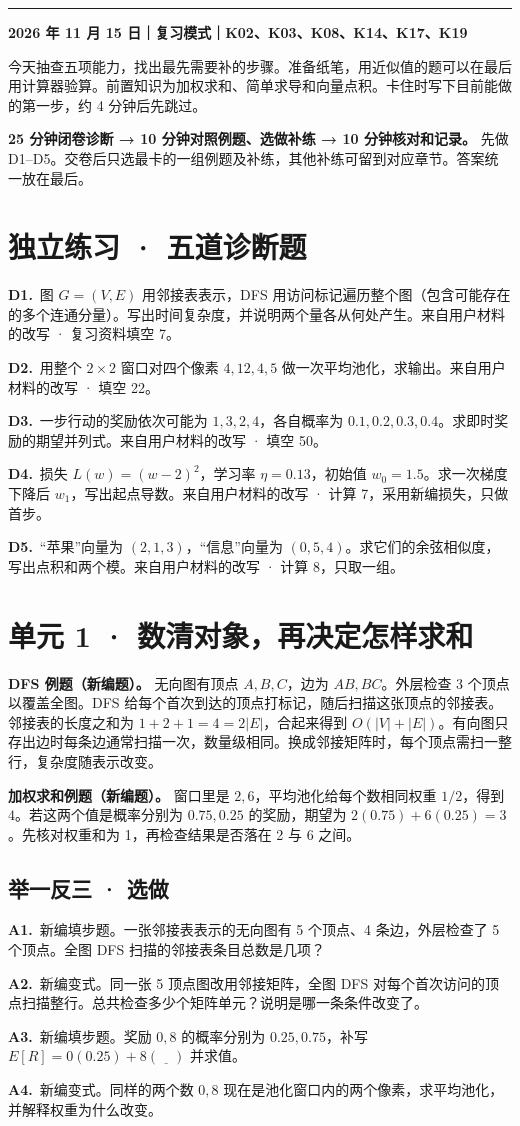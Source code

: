 \documentclass[UTF8,a4paper,11pt]{ctexart}
\newcommand{\chaptertitle}[1]{\Needspace{8\baselineskip}\noindent{\LARGE\bfseries\sffamily #1}\par\vspace{4mm}\hrule\vspace{6mm}}
\newcommand{\PracticeQuestion}[3]{\par\Needspace{4\baselineskip}\noindent\begin{minipage}{\linewidth}\textbf{#1.}\ #2\par\noindent\rule{0pt}{#3mm}\par\end{minipage}\par}
\begin{document}
\chaptertitle{第 1 天 · 45 分钟起点诊断}
\textbf{2026 年 11 月 15 日｜复习模式｜K02、K03、K08、K14、K17、K19}

今天抽查五项能力，找出最先需要补的步骤。准备纸笔，用近似值的题可以在最后用计算器验算。前置知识为加权求和、简单求导和向量点积。卡住时写下目前能做的第一步，约 4 分钟后先跳过。

\textbf{25 分钟闭卷诊断 → 10 分钟对照例题、选做补练 → 10 分钟核对和记录。} 先做 D1–D5。交卷后只选最卡的一组例题及补练，其他补练可留到对应章节。答案统一放在最后。

\section{独立练习 · 五道诊断题}
\PracticeQuestion{D1}{图 $G=(V,E)$ 用邻接表表示，DFS 用访问标记遍历整个图（包含可能存在的多个连通分量）。写出时间复杂度，并说明两个量各从何处产生。来自用户材料的改写 · 复习资料填空 7。}{31}
\PracticeQuestion{D2}{用整个 $2\times2$ 窗口对四个像素 $4,12,4,5$ 做一次平均池化，求输出。来自用户材料的改写 · 填空 22。}{31}
\PracticeQuestion{D3}{一步行动的奖励依次可能为 $1,3,2,4$，各自概率为 $0.1,0.2,0.3,0.4$。求即时奖励的期望并列式。来自用户材料的改写 · 填空 50。}{31}
\clearpage
\PracticeQuestion{D4}{损失 $L(w)=(w-2)^2$，学习率 $\eta=0.13$，初始值 $w_0=1.5$。求一次梯度下降后 $w_1$，写出起点导数。来自用户材料的改写 · 计算 7，采用新编损失，只做首步。}{31}
\PracticeQuestion{D5}{“苹果”向量为 $(2,1,3)$，“信息”向量为 $(0,5,4)$。求它们的余弦相似度，写出点积和两个模。来自用户材料的改写 · 计算 8，只取一组。}{31}
\clearpage
\section{单元 1 · 数清对象，再决定怎样求和}
\textbf{DFS 例题（新编题）。} 无向图有顶点 $A,B,C$，边为 $AB,BC$。外层检查 3 个顶点以覆盖全图。DFS 给每个首次到达的顶点打标记，随后扫描这张顶点的邻接表。邻接表的长度之和为 $1+2+1=4=2|E|$，合起来得到 $O(|V|+|E|)$。有向图只存出边时每条边通常扫描一次，数量级相同。换成邻接矩阵时，每个顶点需扫一整行，复杂度随表示改变。

\textbf{加权求和例题（新编题）。} 窗口里是 $2,6$，平均池化给每个数相同权重 $1/2$，得到 $4$。若这两个值是概率分别为 $0.75,0.25$ 的奖励，期望为 $2(0.75)+6(0.25)=3$。先核对权重和为 1，再检查结果是否落在 2 与 6 之间。

\subsection{举一反三 · 选做}
\PracticeQuestion{A1}{新编填步题。一张邻接表表示的无向图有 5 个顶点、4 条边，外层检查了 5 个顶点。全图 DFS 扫描的邻接表条目总数是几项？}{18}
\PracticeQuestion{A2}{新编变式。同一张 5 顶点图改用邻接矩阵，全图 DFS 对每个首次访问的顶点扫描整行。总共检查多少个矩阵单元？说明是哪一条条件改变了。}{18}
\PracticeQuestion{A3}{新编填步题。奖励 $0,8$ 的概率分别为 $0.25,0.75$，补写 $E[R]=0(0.25)+8(\underline{\quad})$ 并求值。}{18}
\PracticeQuestion{A4}{新编变式。同样的两个数 $0,8$ 现在是池化窗口内的两个像素，求平均池化，并解释权重为什么改变。}{18}
\clearpage
\end{document}
